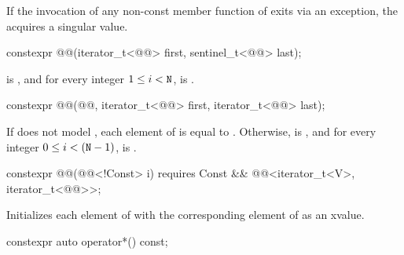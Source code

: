 \pnum
If the invocation of any non-const member function of 
exits via an exception, the  acquires a singular value.

%
\begin{itemdecl}
constexpr @@(iterator_t<@@> first, sentinel_t<@@> last);
\end{itemdecl}

\begin{itemdescr}
\pnum
\ensures
{} is , and
for every integer $1 \leq i < \tcode{N}$,
is .
\end{itemdescr}

%
\begin{itemdecl}
constexpr @@(@@, iterator_t<@@> first, iterator_t<@@> last);
\end{itemdecl}

\begin{itemdescr}
\pnum
\ensures
If  does not model ,
each element of  is equal to .
Otherwise,  is , and
for every integer $0 \leq i < (\tcode{N} - 1)$,
is .
\end{itemdescr}

%
\begin{itemdecl}
constexpr @@(@@<!Const> i)
  requires Const && @@<iterator_t<V>, iterator_t<@@>>;
\end{itemdecl}

\begin{itemdescr}
\pnum
\effects
Initializes each element of 
with the corresponding element of  as an xvalue.
\end{itemdescr}

%
\begin{itemdecl}
constexpr auto operator*() const;
\end{itemdecl}

